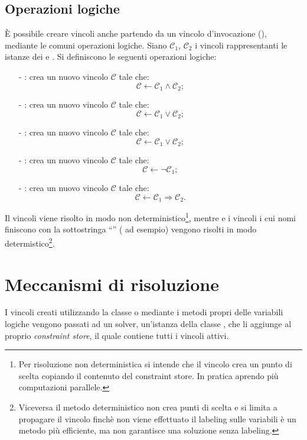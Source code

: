 \subsection{Operazioni logiche}
\`E possibile creare vincoli anche partendo da un
vincolo d'invocazione (), mediante le comuni operazioni
logiche. Siano  $\mathcal{C}_1$, 
$\mathcal{C}_2$ i vincoli rappresentanti le istanze dei 
e . Si definiscono le seguenti operazioni logiche:
\begin{itemize}
\item[-]: crea un nuovo vincolo $\mathcal{C}$
tale che:
\[
\mathcal{C} \leftarrow \mathcal{C}_1 \wedge \mathcal{C}_2;
\]
\item[-]: crea un nuovo vincolo $\mathcal{C}$
tale che:
\[
\mathcal{C} \leftarrow \mathcal{C}_1 \vee \mathcal{C}_2;
\]
\item[-]: crea un nuovo vincolo 
$\mathcal{C}$ tale che:
\[
\mathcal{C} \leftarrow \mathcal{C}_1 \vee \mathcal{C}_2;
\]
\item[-]: crea un nuovo vincolo 
$\mathcal{C}$ tale che:
\[
\mathcal{C} \leftarrow \neg \mathcal{C}_1;
\]
\item[-]: crea un nuovo vincolo 
$\mathcal{C}$
tale che:
\[
\mathcal{C} \leftarrow \mathcal{C}_1 \Rightarrow \mathcal{C}_2.
\]
\end{itemize}
Il vincoli  viene risolto in modo non deterministico\footnote{Per 
risoluzione non deterministica si intende che il vincolo crea un punto
di scelta copiando il contenuto del constraint store. In pratica aprendo più
computazioni parallele.}, mentre   e i vincoli i cui nomi finiscono 
con la
sottostringa ``'' ( ad esempio) vengono risolti
in modo determistico\footnote{Viceversa il metodo deterministico non crea
punti di scelta e si limita a propagare il vincolo finchè non viene effettuato 
il labeling sulle variabili è un metodo più efficiente, ma non garantisce
una soluzione senza labeling.}.

\section{Meccanismi di risoluzione}
I vincoli creati utilizzando la classe  o mediante i metodi
propri delle variabili logiche vengono passati ad un solver, un'istanza 
della classe , che li aggiunge al proprio \emph{constraint
store}, il quale contiene tutti i vincoli attivi.

